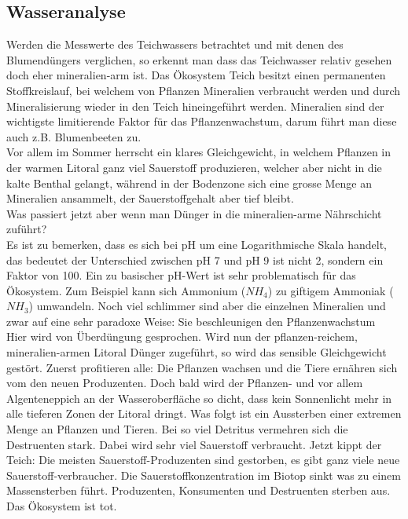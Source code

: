 \documentclass{article}
\begin{document}
    \subsection{Wasseranalyse}
        
        Werden die Messwerte des Teichwassers betrachtet und mit denen des Blumendüngers verglichen, so erkennt man dass das Teichwasser relativ gesehen doch eher mineralien-arm ist. Das Ökosystem Teich besitzt einen permanenten Stoffkreislauf, bei welchem von Pflanzen Mineralien verbraucht werden und durch Mineralisierung wieder in den Teich hineingeführt werden. Mineralien sind der wichtigste limitierende Faktor für das Pflanzenwachstum, darum führt man diese auch z.B. Blumenbeeten zu. \\
        \vspace{5mm}
        Vor allem im Sommer herrscht ein klares Gleichgewicht, in welchem Pflanzen in der warmen Litoral ganz viel Sauerstoff produzieren, welcher aber nicht in die kalte Benthal gelangt, während in der Bodenzone sich eine grosse Menge an Mineralien ansammelt, der Sauerstoffgehalt aber tief bleibt. \\
        \vspace{5mm}
        Was passiert jetzt aber wenn man Dünger in die mineralien-arme Nährschicht zuführt? \\
        Es ist zu bemerken, dass es sich bei pH um eine Logarithmische Skala handelt, das bedeutet der Unterschied zwischen pH 7 und pH 9 ist nicht 2, sondern ein Faktor von 100. Ein zu basischer pH-Wert ist sehr problematisch für das Ökosystem. Zum Beispiel kann sich Ammonium ($NH_4$) zu giftigem Ammoniak ($NH_3$) umwandeln.\cite{Teichpflege} Noch viel schlimmer sind aber die einzelnen Mineralien und zwar auf eine sehr paradoxe Weise: Sie beschleunigen den Pflanzenwachstum \\
        \vspace{5mm}
        Hier wird von Überdüngung gesprochen. Wird nun der pflanzen-reichem, mineralien-armen Litoral Dünger zugeführt, so wird das sensible Gleichgewicht gestört. Zuerst profitieren alle: Die Pflanzen wachsen und die Tiere ernähren sich vom den neuen Produzenten. Doch bald wird der Pflanzen- und vor allem Algenteneppich an der Wasseroberfläche so dicht, dass kein Sonnenlicht mehr in alle tieferen Zonen der Litoral dringt. Was folgt ist ein Aussterben einer extremen Menge an Pflanzen und Tieren. \cite{Planet1} \cite{Planet2}
        \vspace{5mm}
        Bei so viel Detritus vermehren sich die Destruenten stark. Dabei wird sehr viel Sauerstoff verbraucht. Jetzt kippt der Teich: Die meisten Sauerstoff-Produzenten sind gestorben, es gibt ganz viele neue Sauerstoff-verbraucher. Die Sauerstoffkonzentration im Biotop sinkt was zu einem Massensterben führt. Produzenten, Konsumenten und Destruenten sterben aus. Das Ökosystem ist tot. \cite{Planet1} \cite{Planet2} \\
\end{document}
